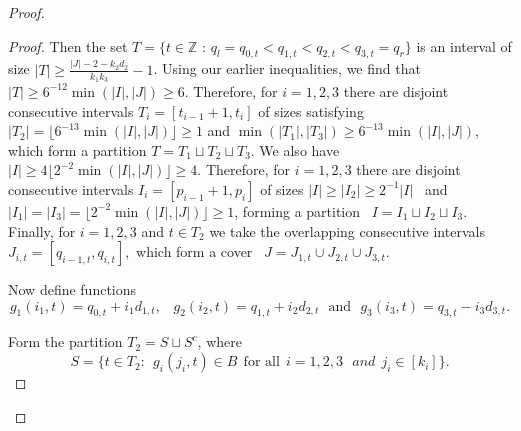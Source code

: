 \documentclass[12pt,reqno]{amsart}
\theoremstyle{definition}
\renewcommand\geq{\geqslant}
\begin{document}
\begin{proof}
\begin{proof}
Then the set $T=\{t\in \mathbb{Z} \text{ : }q_l=q_{0,t} <q_{1,t}<q_{2,t}<q_{3,t}=q_r \}$ is an interval of size
$|T|\geq \frac{|J|-2-k_2d_2}{k_1k_3}-1$.
Using our earlier inequalities, we find that $|T|\geq 6^{-12}\min(|I|,|J|)\geq 6$.
Therefore, for  $i=1,2,3$ there are disjoint consecutive intervals
$T_i=[t_{i-1}+1, t_i]$ of sizes satisfying  $|T_2|=\lfloor 6^{-13}\min(|I|,|J|) \rfloor \geq 1$ and
$\min(|T_1|,|T_3|)\geq 6^{-13}\min(|I|,|J|)$,
which form a partition $T=T_1\sqcup T_2\sqcup T_3$.
We also have $|I|\geq 4\lfloor 2^{-2}\min(|I|,|J|) \rfloor \geq 4$.
Therefore, for  $i=1,2,3$ there are disjoint consecutive intervals $I_i=[p_{i-1}+1,p_i]$ of sizes
$|I|\geq |I_2|\geq 2^{-1}|I|$ \ and \ $|I_1|=|I_3|=\lfloor 2^{-2} \min(|I|,|J|) \rfloor\geq 1$,
forming a partition \ $I=I_1\sqcup I_2 \sqcup I_3$.
Finally, for $i=1,2,3$ and $t\in T_2$  we take the overlapping consecutive intervals
$J_{i,t}=[q_{i-1,t},q_{i,t}],$
which form a cover \ $J=J_{1,t}\cup J_{2,t}\cup J_{3,t}$.

Now define functions                                                                                                                                                                   
\begin{equation}\label{eq25.29963}                                                                                                                                                 
g_1(i_1,t)=q_{0,t}+i_1 d_{1,t} \text{, } \ \ \  g_2(i_2,t)=q_{1,t}+i_2 d_{2,t} \ \ \  \text{and} \ \ \  g_3(i_3,t)=q_{3,t}-i_3 d_{3,t}.                                            
\end{equation}                                 
                                                                                                                                                                                   
\vspace{5pt}                                                                                                                                                                       
\noindent                                                                                                                                                                          
Form the partition $T_2=S\sqcup S^c$, where                                                                                                                                        
\begin{equation}\label{eq25.29965}                                                                                                                                                 
S=\{t\in T_2 : \ \  g_i(j_i,t)\in B \ \ \text{for all} \ \ i=1,2,3 \ \ \ and \ \ j_i \in [k_i]\}.                                                                                         
\end{equation}                                                                                        



\end{proof}
\end{proof}
\end{document}
